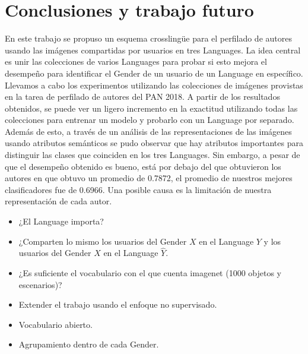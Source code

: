 \documentclass[runningheads]{llncs}
\begin{document}
\section{Conclusiones y trabajo futuro}
En este trabajo se propuso un esquema crosslingüe para el perfilado de autores
usando las imágenes compartidas por usuarios en tres Languages. La idea central
es unir las colecciones de varios Languages para probar si esto mejora el 
desempeño para identificar el Gender de un usuario de un Language en específico.
Llevamos a cabo los experimentos utilizando las colecciones de imágenes
provistas en la tarea de perfilado de autores
del PAN 2018. A partir de los resultados obtenidos, se puede ver un 
ligero incremento en la exactitud utilizando todas las colecciones para
entrenar un modelo y probarlo con un Language por separado.
Además de esto, a través de un análisis de las representaciones
de las imágenes usando atributos semánticos se pudo observar que hay 
atributos importantes para distinguir las clases que coinciden en 
los tres Languages. Sin embargo, a pesar de que el desempeño obtenido es bueno,
está por debajo del que obtuvieron los autores en \cite{takahashi_tahara_nagatan_miura_taniguchi_ohkuma} que obtuvo
un promedio de 0.7872, el promedio de nuestros mejores clasificadores fue 
de 0.6966. Una posible causa es la limitación de nuestra representación
de cada autor.
\begin{itemize}
    \item ¿El Language importa? 
    \item ¿Comparten lo mismo los usuarios del Gender $X$ en el Language
    $Y$ y los usuarios del Gender $X$ en el Language $\hat{Y}$.
    \item ¿Es suficiente el vocabulario con el que cuenta imagenet
    (1000 objetos y escenarios)?
    \item Extender el trabajo usando el enfoque no supervisado.
    \item Vocabulario abierto.
    \item Agrupamiento dentro de cada Gender.
\end{itemize}



\end{document}
